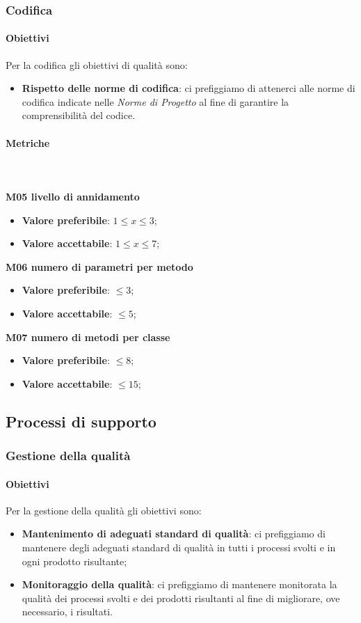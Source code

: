 		\subsubsection{Codifica}
			\paragraph{Obiettivi}
			Per la codifica gli obiettivi di qualità sono:
			\begin{itemize}
				\item \textbf{Rispetto delle norme di codifica}: ci prefiggiamo di attenerci alle norme di codifica indicate nelle \textit{Norme di Progetto} al fine di garantire la comprensibilità del codice.
			\end{itemize}	 
			\paragraph{Metriche} \mbox{} \\ \\
			\textbf{M05 livello di annidamento} 
			\begin{itemize}
				\item \textbf{Valore preferibile}: $1 \le x \le 3$; 
				\item \textbf{Valore accettabile}: $1 \le x \le 7$; 
			\end{itemize}
			\textbf{M06 numero di parametri per metodo} 
			\begin{itemize}
				\item \textbf{Valore preferibile}: $ \le 3$;
				\item \textbf{Valore accettabile}: $ \le 5$;
			\end{itemize}			
			\textbf{M07 numero di metodi per classe} 
			\begin{itemize}
				\item \textbf{Valore preferibile}: $ \le 8$;
				\item \textbf{Valore accettabile}: $ \le 15$;
			\end{itemize}
	
			
	\subsection{Processi di supporto}			
		\subsubsection{Gestione della qualità}
			\paragraph{Obiettivi}
			Per la gestione della qualità gli obiettivi sono:
			\begin{itemize}
				\item \textbf{Mantenimento di adeguati standard di qualità}: ci prefiggiamo di mantenere degli adeguati standard di qualità in tutti i processi svolti e in ogni prodotto risultante;
				\item \textbf{Monitoraggio della qualità}: ci prefiggiamo di mantenere monitorata la qualità dei processi svolti e dei prodotti risultanti al fine di migliorare, ove necessario, i risultati.
			\end{itemize}	 
